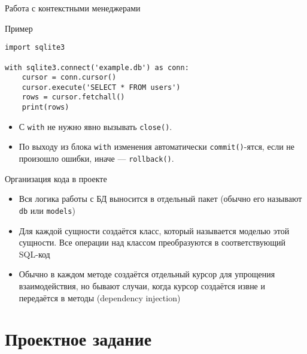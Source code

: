 \documentclass{beamer}
\begin{document}
\begin{frame}[fragile]{Работа с контекстными менеджерами}
	\begin{block}{Пример}
		\begin{verbatim}
import sqlite3

with sqlite3.connect('example.db') as conn:
    cursor = conn.cursor()
    cursor.execute('SELECT * FROM users')
    rows = cursor.fetchall()
    print(rows)
\end{verbatim}
	\end{block}

	\begin{itemize}
		\item С \texttt{with} не нужно явно вызывать \texttt{close()}.
		\item По выходу из блока \texttt{with} изменения автоматически \texttt{commit()}-ятся,
		      если не произошло ошибки, иначе — \texttt{rollback()}.
	\end{itemize}
\end{frame}

\begin{frame}{Организация кода в проекте}
	\begin{itemize}
		\item Вся логика работы с БД выносится в отдельный пакет (обычно его называют \texttt{db} или \texttt{models})
		\item Для каждой сущности создаётся класс, который называется моделью этой сущности. Все операции над классом преобразуются в соответствующий SQL-код
		\item Обычно в каждом методе создаётся отдельный курсор для упрощения взаимодействия, но бывают случаи, когда курсор создаётся извне и передаётся в методы (dependency injection)
	\end{itemize}
\end{frame}

\section{Проектное задание}
\end{document}
